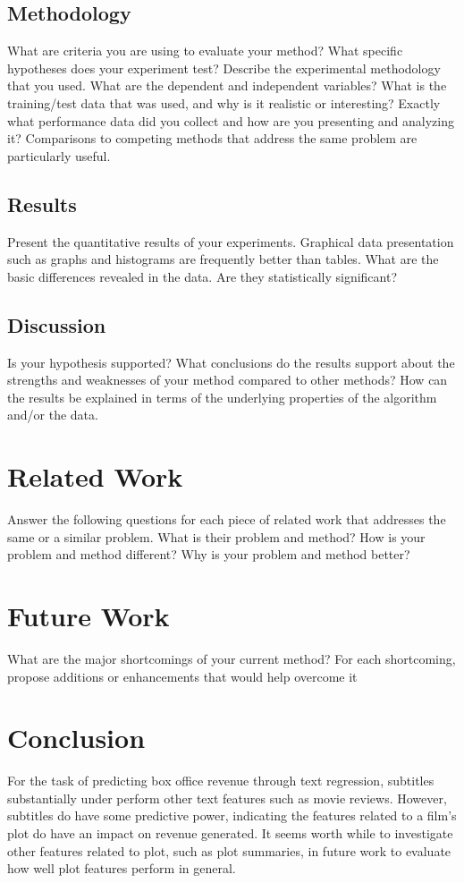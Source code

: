 \documentclass[11pt]{article}
\begin{document}
\subsection{Methodology}
What are criteria you are using to evaluate your method? What specific hypotheses does
your experiment test? Describe the experimental methodology that you used. What are the
dependent and independent variables? What is the training/test data that was used, and why
is it realistic or interesting? Exactly what performance data did you collect and how are
you presenting and analyzing it? Comparisons to competing methods that address the same
problem are particularly useful.

\subsection{Results}
Present the quantitative results of your experiments. Graphical data presentation such as
graphs and histograms are frequently better than tables. What are the basic differences
revealed in the data. Are they statistically significant?

\subsection{Discussion}
Is your hypothesis supported? What conclusions do the results support about the strengths
and weaknesses of your method compared to other methods? How can the results be explained
in terms of the underlying properties of the algorithm and/or the data.

\section{Related Work}
Answer the following questions for each piece of related work that addresses the same or
a similar problem. What is their problem and method? How is your problem and method
different? Why is your problem and method better?

\section{Future Work}
What are the major shortcomings of your current method? For each shortcoming, propose
additions or enhancements that would help overcome it

\section{Conclusion}
For the task of predicting box office revenue through text regression, subtitles
substantially under perform other text features such as movie reviews. However,
subtitles do have some predictive power, indicating the features related to a film's plot
do have an impact on revenue generated. It seems worth while to investigate other
features related to plot, such as plot summaries, in future work to evaluate how well
plot features perform in general.
\end{document}
